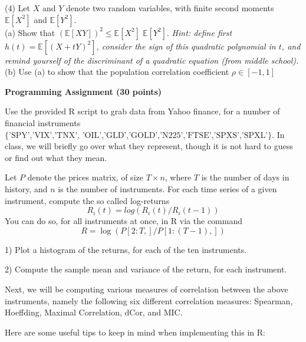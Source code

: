 \documentclass[12pt]{article}
\begin{document}
(4) Let $X$ and $Y$ denote two random variables, with finite second moments $\mathbb{E}[X^2]$ and $\mathbb{E}[Y^2]$. \\ 

(a) Show that $ \left( \mathbb{E}[XY] \right)^2  \leq \mathbb{E}[X^2] \; \mathbb{E}[Y^2]$. \textit{Hint: define first $ h(t) = \mathbb{E}[ (X + tY)^2 ] $, consider the sign of this quadratic polynomial in $t$, and remind yourself of the discriminant of a quadratic equation (from middle school).} \\
 
(b) Use (a) to show that the population correlation coefficient $\rho \in [-1,1]$ 
 

\clearpage
 
\textbf{Programming Assignment (30 points)}

Use the provided R script to grab data from Yahoo finance, for a number of financial instruments
$\{ \mbox{'SPY','\^{}VIX','\^{}TNX', 'OIL','GLD','GOLD','\^{}N225','\^{}FTSE','SPXS','SPXL'} \}$. 
In class, we will briefly go over what they represent, though it is not hard to guess or find out what they mean.

\vspace{3mm}

Let $P$ denote the prices matrix, of size $T \times n$, where $T$ is the number of days in history, and $n$ is the number of instruments.  For each time series of a given instrument, compute the so called log-returns
	$$ R_i(t) = log( R_i(t)/R_i(t-1) ) $$
You can do so, for all instruments at once, in R via the command
$$R = \log( P[2:T, ] / P[1:(T-1),])$$

1) Plot a histogram of the returns, for each of the ten instruments.

\vspace{3mm}

2) Compute the sample mean and variance of the return, for each instrument. 

\vspace{6mm}

Next, we will be computing various measures of correlation between the above instruments, namely the following six different correlation measures:  Spearman, Hoeffding, Maximal Correlation, dCor, and MIC.

Here are some useful tips to keep in mind when implementing this in R:
\end{document}
